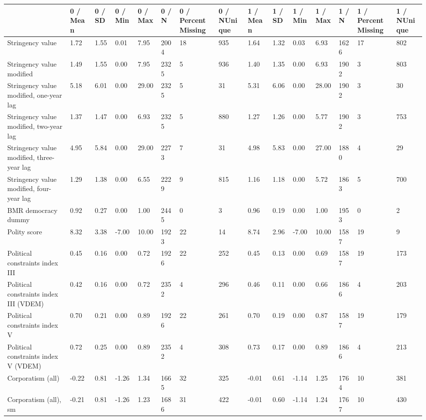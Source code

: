 
\begin{longtable}{lllllllllllllll}
\toprule
  & 0 / Mean & 0 / SD & 0 / Min & 0 / Max & 0 / N & 0 / PercentMissing & 0 / NUnique & 1 / Mean & 1 / SD & 1 / Min & 1 / Max & 1 / N & 1 / PercentMissing & 1 / NUnique\\
\midrule
Stringency value & 1.72 & 1.55 & 0.01 & 7.95 & 2004 & 18 & 935 & 1.64 & 1.32 & 0.03 & 6.93 & 1626 & 17 & 802\\
Stringency value modified & 1.49 & 1.55 & 0.00 & 7.95 & 2325 & 5 & 936 & 1.40 & 1.35 & 0.00 & 6.93 & 1902 & 3 & 803\\
Stringency value modified, one-year lag & 5.18 & 6.01 & 0.00 & 29.00 & 2325 & 5 & 31 & 5.31 & 6.06 & 0.00 & 28.00 & 1902 & 3 & 30\\
Stringency value modified, two-year lag & 1.37 & 1.47 & 0.00 & 6.93 & 2325 & 5 & 880 & 1.27 & 1.26 & 0.00 & 5.77 & 1902 & 3 & 753\\
Stringency value modified, three-year lag & 4.95 & 5.84 & 0.00 & 29.00 & 2273 & 7 & 31 & 4.98 & 5.83 & 0.00 & 27.00 & 1880 & 4 & 29\\
\addlinespace
Stringency value modified, four-year lag & 1.29 & 1.38 & 0.00 & 6.55 & 2229 & 9 & 815 & 1.16 & 1.18 & 0.00 & 5.72 & 1863 & 5 & 700\\
BMR democracy dummy & 0.92 & 0.27 & 0.00 & 1.00 & 2445 & 0 & 3 & 0.96 & 0.19 & 0.00 & 1.00 & 1953 & 0 & 2\\
Polity score & 8.32 & 3.38 & -7.00 & 10.00 & 1923 & 22 & 14 & 8.74 & 2.96 & -7.00 & 10.00 & 1587 & 19 & 9\\
Political constraints index III & 0.45 & 0.16 & 0.00 & 0.72 & 1926 & 22 & 252 & 0.45 & 0.13 & 0.00 & 0.69 & 1587 & 19 & 173\\
Political constraints index III (VDEM) & 0.42 & 0.16 & 0.00 & 0.72 & 2352 & 4 & 296 & 0.46 & 0.11 & 0.00 & 0.66 & 1866 & 4 & 203\\
\addlinespace
Political constraints index V & 0.70 & 0.21 & 0.00 & 0.89 & 1926 & 22 & 261 & 0.70 & 0.19 & 0.00 & 0.87 & 1587 & 19 & 179\\
Political constraints index V (VDEM) & 0.72 & 0.25 & 0.00 & 0.89 & 2352 & 4 & 308 & 0.73 & 0.17 & 0.00 & 0.89 & 1866 & 4 & 213\\
Corporatism (all) & -0.22 & 0.81 & -1.26 & 1.34 & 1665 & 32 & 325 & -0.01 & 0.61 & -1.14 & 1.25 & 1764 & 10 & 381\\
Corporatism (all), sm & -0.21 & 0.81 & -1.26 & 1.23 & 1686 & 31 & 422 & -0.01 & 0.60 & -1.14 & 1.24 & 1767 & 10 & 430\\

\end{longtable}
